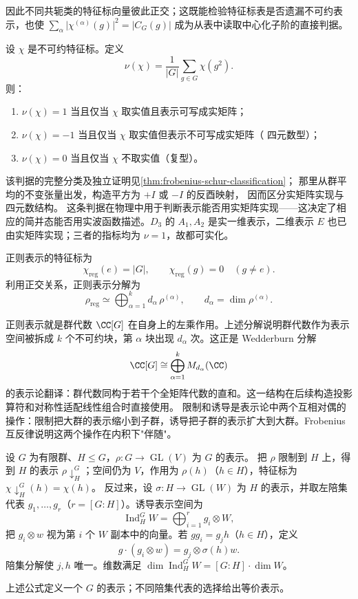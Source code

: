 因此不同共轭类的特征标向量彼此正交；这既能检验特征标表是否遗漏不可约表示，也使
$\sum_\alpha\lvert\chi^{(\alpha)}(g)\rvert^2=\lvert C_G(g)\rvert$
成为从表中读取中心化子阶的直接判据。
\begin{proposition}[特征标的实性判据]
设 $\chi$ 是不可约特征标。定义
\[
\nu(\chi)=\frac1{\lvert G\rvert}\sum_{g\in G}\chi(g^2).
\]
则：
\begin{enumerate}[label=(\roman*),leftmargin=3em]
\item $\nu(\chi)=1$ 当且仅当 $\chi$ 取实值且表示可写成实矩阵；
\item $\nu(\chi)=-1$ 当且仅当 $\chi$ 取实值但表示不可写成实矩阵（ 四元数型）；
\item $\nu(\chi)=0$ 当且仅当 $\chi$ 不取实值（复型）。
\end{enumerate}
\label{prop:character-reality}
\end{proposition}
该判据的完整分类及独立证明见\cref{thm:frobenius-schur-classification}；
那里从群平均的不变张量出发，构造平方为 $+I$ 或 $-I$ 的反酉映射，
因而区分实矩阵实现与四元数结构。
这条判据在物理中用于判断表示能否用实矩阵实现——这决定了相应的简并态能否用实波函数描述。$D_3$ 的 $A_1,A_2$ 是实一维表示，二维表示 $E$ 也已由实矩阵实现；三者的指标均为 $\nu=1$，故都可实化。
\begin{proposition}[正则表示的特征标与投影]
正则表示的特征标为
\[
\chi_{\mathrm{reg}}(e)=\lvert G\rvert,
\qquad
\chi_{\mathrm{reg}}(g)=0\quad(g\neq e).
\]
利用正交关系，正则表示分解为
\[
\rho_{\mathrm{reg}}\simeq\bigoplus_{\alpha=1}^{k}d_\alpha\,\rho^{(\alpha)},
\qquad
d_\alpha=\dim\rho^{(\alpha)}.
\]
\label{prop:regular-character}
\end{proposition}
正则表示就是群代数 $\CC[G]$ 在自身上的左乘作用。上述分解说明群代数作为表示空间被拆成 $k$ 个不可约块，第 $\alpha$ 块出现 $d_\alpha$ 次。这正是 Wedderburn 分解
\[
\CC[G]\cong\bigoplus_{\alpha=1}^{k}M_{d_\alpha}(\CC)
\]
的表示论翻译：群代数同构于若干个全矩阵代数的直和。这一结构在后续构造投影算符和对称性适配线性组合时直接使用。
限制和诱导是表示论中两个互相对偶的操作：限制把大群的表示缩小到子群，诱导把子群的表示扩大到大群。Frobenius 互反律说明这两个操作在内积下"伴随"。
\begin{definition}[限制表示与诱导表示]
设 $G$ 为有限群、$H\leqslant G$，$\rho:G\to\operatorname{GL}(V)$ 为 $G$ 的表示。
把 $\rho$ 限制到 $H$ 上，得到 $H$ 的表示 $\rho\downarrow_H^G$；空间仍为 $V$，作用为 $\rho(h)$（$h\in H$），特征标为 $\chi\downarrow_H^G(h)=\chi(h)$。
反过来，设 $\sigma:H\to\operatorname{GL}(W)$ 为 $H$ 的表示，并取左陪集代表 $g_1,\dots,g_r$（$r=[G:H]$）。诱导表示空间为
\[
\operatorname{Ind}_H^G W=\bigoplus_{i=1}^{r}g_i\otimes W,
\]
把 $g_i\otimes w$ 视为第 $i$ 个 $W$ 副本中的向量。若 $gg_i=g_jh$（$h\in H$），定义
\[
g\cdot(g_i\otimes w)=g_j\otimes\sigma(h)w.
\]
陪集分解使 $j,h$ 唯一。维数满足 $\dim\operatorname{Ind}_H^G W=[G:H]\cdot\dim W$。
\label{def:restriction-induction}
\end{definition}
\begin{proposition}[诱导作用的相容性]
上述公式定义一个 $G$ 的表示；不同陪集代表的选择给出等价表示。
\end{proposition}

